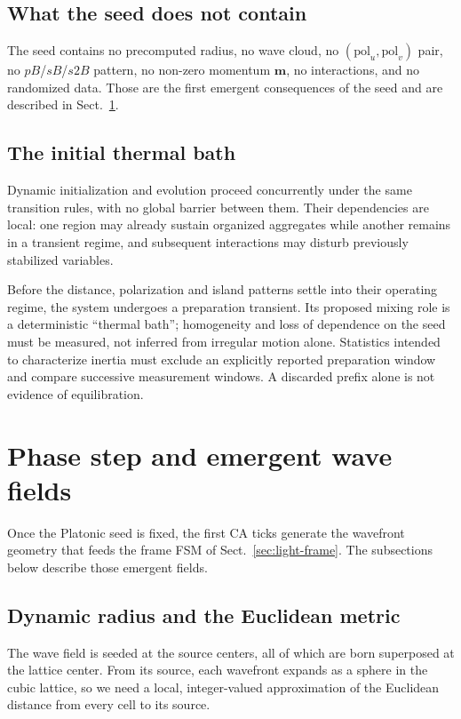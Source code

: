 \documentclass{ijuc}
\begin{document}
\subsection{What the seed does not contain}
The seed contains no precomputed radius, no wave cloud, no $(\mathrm{pol}_u,\mathrm{pol}_v)$ pair, no $pB$/$sB$/$s2B$ pattern, no non-zero momentum $\boldsymbol{m}$, no interactions, and no randomized data.  Those are the first emergent consequences of the seed and are described in Sect.~\ref{sec:phase-step}.
\subsection{The initial thermal bath}
Dynamic initialization and evolution proceed concurrently under the same transition rules, with no global barrier between them. Their dependencies are local: one region may already sustain organized aggregates while another remains in a transient regime, and subsequent interactions may disturb previously stabilized variables.

Before the distance, polarization and island patterns settle into their operating regime, the system undergoes a preparation transient. Its proposed mixing role is a deterministic ``thermal bath''; homogeneity and loss of dependence on the seed must be measured, not inferred from irregular motion alone. Statistics intended to characterize inertia must exclude an explicitly reported preparation window and compare successive measurement windows. A discarded prefix alone is not evidence of equilibration.
\section{Phase step and emergent wave fields}\label{sec:phase-step}
Once the Platonic seed is fixed, the first CA ticks generate the wavefront geometry that feeds the frame FSM of Sect.~\ref{sec:light-frame}.  The subsections below describe those emergent fields.
\subsection{Dynamic radius and the Euclidean metric}\label{subsec:wavefront-metric}
The wave field is seeded at the source centers, all of which are born superposed at the lattice center.  From its source, each wavefront expands as a sphere in the cubic lattice, so we need a local, integer-valued approximation of the Euclidean distance from every cell to its source.
\end{document}
